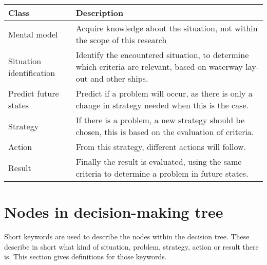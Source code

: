 \begin{table}[H]
	\begin{tabular}{p{}|p{}}
		\toprule
		Class & Description\\
		\midrule
		Mental model & Acquire knowledge about the situation, not within the scope of this research \\
		Situation identification & Identify the encountered situation, to determine which criteria are relevant, based on waterway lay-out and other ships. \\
		Predict future states & Predict if a problem will occur, as there is only a change in strategy needed when this is the case. \\
		Strategy & If there is a problem, a new strategy should be chosen, this is based on the evaluation of criteria. \\
		Action & From this strategy, different actions will follow. \\
		Result & Finally the result is evaluated, using the same criteria to determine a problem in future states. \\
		\bottomrule
	\end{tabular}
	
	\label{tab:phases-description}
\end{table}

\section{Nodes in decision-making tree}
Short keywords are used to describe the nodes within the decision tree. These describe in short what kind of situation, problem, strategy, action or result there is. This section gives definitions for those keywords.

